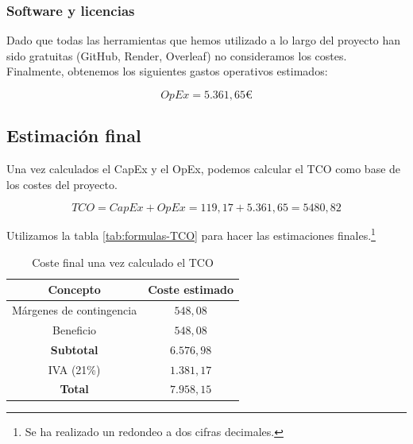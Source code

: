 \subsubsection{Software y licencias}

Dado que todas las herramientas que hemos utilizado a lo largo del proyecto han sido gratuitas (GitHub, Render, Overleaf) no consideramos los costes. Finalmente, obtenemos los siguientes gastos operativos estimados:

\[ OpEx = 5.361,65 € \]

\subsection{Estimación final}

Una vez calculados el CapEx y el OpEx, podemos calcular el TCO como base de los costes del proyecto.

\[ TCO = CapEx + OpEx = 119,17 + 5.361,65 = 5480,82 \]

Utilizamos la tabla \ref{tab:formulas-TCO} para hacer las estimaciones finales.\footnote{Se ha realizado un redondeo a dos cifras decimales.}

\begin{table}[!ht]
    \centering
    \begin{tabular}{cc}\toprule
        \textbf{Concepto}& \textbf{Coste estimado}\\\midrule
        Márgenes de contingencia&$548,08$\\
        Beneficio&$548,08$\\ \hline
        \textbf{Subtotal}&$6.576,98$\\ \hline
        IVA (21\%)&$1.381,17$\\ \hline
        \textbf{Total}& $7.958,15$\\ \bottomrule
    \end{tabular}
    \caption{Coste final una vez calculado el TCO}
    \label{tab:calculo-TCO}
\end{table}